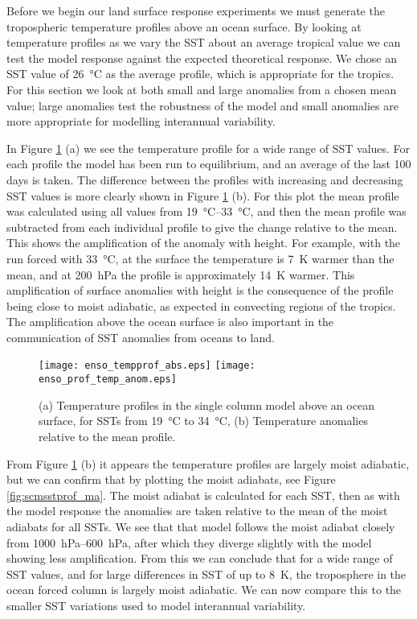 Before we begin our land surface response experiments we must generate the 
tropospheric temperature profiles above an ocean surface. By looking at 
temperature profiles as we vary the SST about an average tropical value we can 
test the model response against the expected theoretical response. We chose an 
SST value of \SI{26}{\degreeCelsius} as the average profile, which is 
appropriate for the tropics. For this section we look at both small and large 
anomalies from a chosen mean value; large anomalies test the robustness of the 
model and small anomalies are more appropriate for modelling interannual 
variability.

In Figure \ref{fig:scmsstprof_large} (a) we see the temperature profile for a 
wide range of SST values. For each profile the model has been run to 
equilibrium, and an average of the last 100 days is taken. The difference 
between the profiles with increasing and decreasing SST values is more clearly 
shown in Figure \ref{fig:scmsstprof_large} (b). For this plot the mean profile 
was calculated using all values from \SIrange{19}{33}{\degreeCelsius}, and then 
the mean profile was subtracted from each individual profile to give the change 
relative to the mean. This shows the amplification of the anomaly with height.  
For example, with the run forced with \SI{33}{\degreeCelsius}, at the surface 
the temperature is \SI{7}{\kelvin} warmer than the mean, and at 
\SI{200}{\hecto\pascal} the profile is approximately \SI{14}{\kelvin} warmer.  
This amplification of surface anomalies with height is the consequence of the 
profile being close to moist adiabatic, as expected in convecting regions of the 
tropics. The amplification above the ocean surface is also important in the 
communication of SST anomalies from oceans to land. 

\begin{figure}[ht]
\texttt{[image: enso\_tempprof\_abs.eps]}
\texttt{[image: enso\_prof\_temp\_anom.eps]}
\caption{(a) Temperature profiles in the single column model above an ocean 
	surface, for SSTs from \SI{19}{\degreeCelsius} to \SI{34}{\degreeCelsius}, 
(b) Temperature anomalies relative to the mean profile.}
\label{fig:scmsstprof_large}
\end{figure}

From Figure \ref{fig:scmsstprof_large} (b) it appears the temperature profiles 
are largely moist adiabatic, but we can confirm that by plotting the moist 
adiabats, see Figure \ref{fig:scmsstprof_ma}. The moist adiabat is calculated 
for each SST, then as with the model response the anomalies are taken relative 
to the mean of the moist adiabats for all SSTs. We see that that model follows 
the moist adiabat closely from \SIrange{1000}{600}{\hecto\pascal}, after which 
they diverge slightly with the model showing less amplification. From this we 
can conclude that for a wide range of SST values, and for large differences in 
SST of up to \SI{8}{\kelvin}, the troposphere in the ocean forced column is 
largely moist adiabatic.  We can now compare this to the smaller SST variations 
used to model interannual variability.

